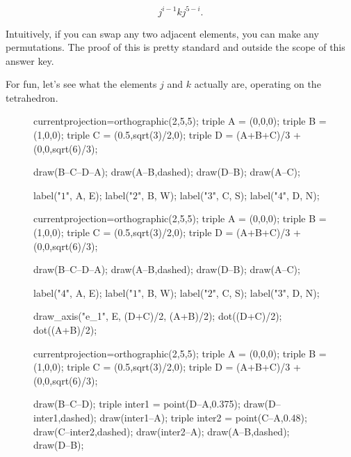 \documentclass[../gatm_answers.tex]{subfiles}
\begin{document}
$$j^{i-1}kj^{5-i}.$$

\noindent Intuitively, if you can swap any two adjacent elements, you can make any permutations. The proof of this is pretty standard and outside the scope of this answer key.

For fun, let's see what the elements $j$ and $k$ actually are, operating on the tetrahedron.

\begin{figure}[h]
	\begin{center}
		\begin{minipage}{0.3\textwidth}
			\centering
			\begin{asy}[width=0.9\textwidth]
			currentprojection=orthographic(2,5,5);
			triple A = (0,0,0);
			triple B = (1,0,0);
			triple C = (0.5,sqrt(3)/2,0);
			triple D = (A+B+C)/3 + (0,0,sqrt(6)/3);
			
			draw(B--C--D--A);
			draw(A--B,dashed);
			draw(D--B);
			draw(A--C);
			
			label("$1$", A, E);
			label("$2$", B, W);
			label("$3$", C, S);
			label("$4$", D, N);
			\end{asy}
		\end{minipage}
		\hfill
		\begin{minipage}{0.3\textwidth}
			\centering
			\begin{asy}[width=0.9\textwidth]
			currentprojection=orthographic(2,5,5);
			triple A = (0,0,0);
			triple B = (1,0,0);
			triple C = (0.5,sqrt(3)/2,0);
			triple D = (A+B+C)/3 + (0,0,sqrt(6)/3);
			
			draw(B--C--D--A);
			draw(A--B,dashed);
			draw(D--B);
			draw(A--C);
			
			label("$4$", A, E);
			label("$1$", B, W);
			label("$2$", C, S);
			label("$3$", D, N);
			
			draw_axis("e_1", E, (D+C)/2, (A+B)/2);
			dot((D+C)/2);
			dot((A+B)/2);
			\end{asy}
		\end{minipage}
		\hfill
		\begin{minipage}{0.3\textwidth}
			\centering
			\begin{asy}[width=0.9\textwidth]
			currentprojection=orthographic(2,5,5);
			triple A = (0,0,0);
			triple B = (1,0,0);
			triple C = (0.5,sqrt(3)/2,0);
			triple D = (A+B+C)/3 + (0,0,sqrt(6)/3);
			
			draw(B--C--D);
			triple inter1 = point(D--A,0.375);
			draw(D--inter1,dashed);
			draw(inter1--A);
			triple inter2 = point(C--A,0.48);
			draw(C--inter2,dashed);
			draw(inter2--A);
			draw(A--B,dashed);
			draw(D--B);
			

\end{asy}
\end{minipage}
\end{center}
\end{figure}
\end{document}
